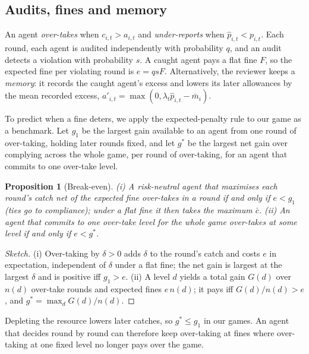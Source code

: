 \documentclass[letterpaper]{article} %
\newtheorem{proposition}{Proposition}
\newcommand{\gone}{g_1}
\newcommand{\gstar}{g^{*}}
\begin{document}
\subsection{Audits, fines and memory}

An agent \emph{over-takes} when $c_{i,t}>a_{i,t}$ and \emph{under-reports} when $\hat p_{i,t}<p_{i,t}$. Each round, each agent is audited independently with probability $q$, and an audit detects a violation with probability $s$. A caught agent pays a flat fine $F$, so the expected fine per violating round is $e=qsF$. Alternatively, the reviewer keeps a \emph{memory}: it records the caught agent's excess and lowers its later allowances by the mean recorded excess, $a'_{i,t}=\max(0,\lambda_t\hat p_{i,t}-\bar m_i)$.

To predict when a fine deters, we apply the expected-penalty rule \citep{becker1968crime} to our game as a benchmark. Let $\gone$ be the largest gain available to an agent from one round of over-taking, holding later rounds fixed, and let $\gstar$ be the largest net gain over complying across the whole game, per round of over-taking, for an agent that commits to one over-take level.

\begin{proposition}[Break-even]
\label{prop:breakeven}
(i) A risk-neutral agent that maximises each round's catch net of the expected fine over-takes in a round if and only if $e<\gone$ (ties go to compliance); under a flat fine it then takes the maximum $\bar c$. (ii) An agent that commits to one over-take level for the whole game over-takes at some level if and only if $e<\gstar$.
\end{proposition}
\begin{proof}[Sketch]
(i) Over-taking by $\delta>0$ adds $\delta$ to the round's catch and costs $e$ in expectation, independent of $\delta$ under a flat fine; the net gain is largest at the largest $\delta$ and is positive iff $\gone>e$. (ii) A level $d$ yields a total gain $G(d)$ over $n(d)$ over-take rounds and expected fines $e\,n(d)$; it pays iff $G(d)/n(d)>e$, and $\gstar=\max_d G(d)/n(d)$.
\end{proof}

Depleting the resource lowers later catches, so $\gstar\le\gone$ in our games. An agent that decides round by round can therefore keep over-taking at fines where over-taking at one fixed level no longer pays over the game.
\end{document}
